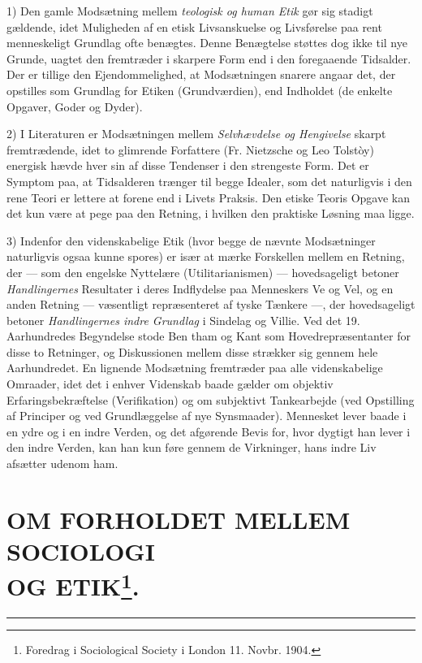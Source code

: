 \documentclass[12pt,a4paper,openany]{book}
\newcommand{\opage}[1]{\marginnote{\footnotesize\textit{[#1]}}}
\newcommand{\essay}[2][]{\chapter*{#2}\addcontentsline{toc}{chapter}{#1}}   %
\newcommand{\streg}{\begin{center}\rule{3em}{0.4pt}\end{center}}
\begin{document}
1) Den gamle Modsætning mellem \textit{teologisk og human Etik}
gør sig stadigt gældende, idet Muligheden af en etisk Livsanskuelse
og Livsførelse paa rent menneskeligt Grundlag ofte
benægtes. Denne Benægtelse støttes dog ikke til nye Grunde,
uagtet den fremtræder i skarpere Form end i den foregaaende
Tidsalder. Der er tillige den Ejendommelighed, at Modsætningen
snarere angaar det, der opstilles som Grundlag for Etiken (Grundværdien),
end Indholdet (de enkelte Opgaver, Goder og Dyder).

2) I Literaturen er Modsætningen mellem \textit{Selvhævdelse og
Hengivelse} skarpt fremtrædende, idet to glimrende Forfattere (Fr.
Nietzsche og Leo Tolstòy) energisk hævde hver sin af disse
Tendenser i den strengeste Form. Det er Symptom paa, at Tidsalderen
trænger til begge Idealer, som det naturligvis i den rene
Teori er lettere at forene end i Livets Praksis. Den etiske
Teoris Opgave kan det kun være at pege paa den Retning, i
hvilken den praktiske Løsning maa ligge.

3) Indenfor den videnskabelige Etik (hvor begge de nævnte
Modsætninger naturligvis ogsaa kunne spores) er især at mærke
Forskellen mellem en Retning, der --- som den engelske Nyttelære
(Utilitarianismen) --- hovedsageligt betoner \textit{Handlingernes}
Resultater i deres Indflydelse paa Menneskers Ve og Vel, og en
anden Retning --- væsentligt repræsenteret af tyske Tænkere ---,
der hovedsageligt betoner \textit{Handlingernes indre Grundlag} i Sindelag
og Villie. Ved det 19. Aarhundredes Begyndelse stode Ben%
\setcounter{footnote}{0}%
\opage{67}tham og Kant som Hovedrepræsentanter for disse to Retninger,
og Diskussionen mellem disse strækker sig gennem hele Aarhundredet.
En lignende Modsætning fremtræder paa alle videnskabelige
Omraader, idet det i enhver Videnskab baade gælder
om objektiv Erfaringsbekræftelse (Verifikation) og om subjektivt
Tankearbejde (ved Opstilling af Principer og ved Grundlæggelse
af nye Synsmaader). Mennesket lever baade i en ydre og i en
indre Verden, og det afgørende Bevis for, hvor dygtigt han
lever i den indre Verden, kan han kun føre gennem de Virkninger,
hans indre Liv afsætter udenom ham.

\setcounter{footnote}{0}%
\opage{68}\essay[Sociologi og Etik (1904)]{OM FORHOLDET MELLEM SOCIOLOGI \\ OG ETIK\footnote[1]{Foredrag i Sociological Society i London 11. Novbr. 1904.}.}
\streg
\end{document}
